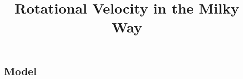 \documentclass{article}
\title{Rotational Velocity in the Milky Way}
\begin{document}
\maketitle




\begin{multicols}{2}

\section{Model}







\end{multicols}

\printbibliography
\end{document}
